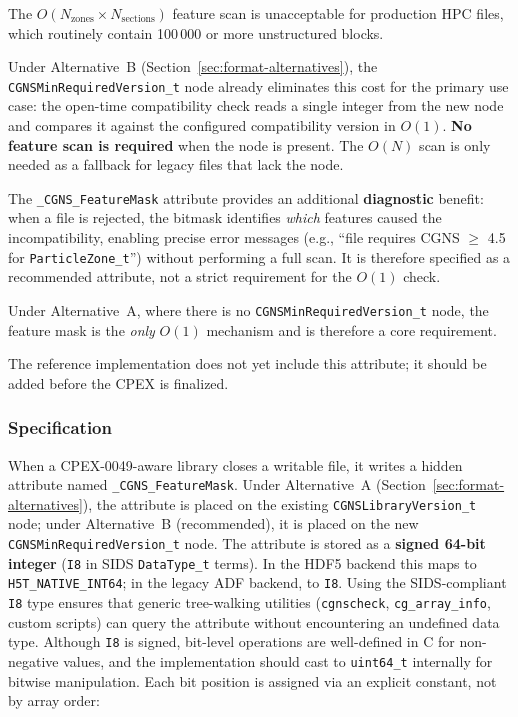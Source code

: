 \documentclass[11pt,letterpaper]{article}
\begin{document}
The $O(N_{\mathrm{zones}} \times N_{\mathrm{sections}})$ feature scan
is unacceptable for production HPC files, which routinely contain
100\,000 or more unstructured blocks.

Under Alternative~B (Section~\ref{sec:format-alternatives}), the
\texttt{CGNSMinRequiredVersion\_t} node already eliminates this cost
for the primary use case: the open-time compatibility check reads a
single integer from the new node and compares it against the
configured compatibility version in $O(1)$.  \textbf{No feature scan is required}
when the node is present.  The $O(N)$ scan is only needed as a
fallback for legacy files that lack the node.

The \texttt{\_CGNS\_FeatureMask} attribute provides an additional
\textbf{diagnostic} benefit: when a file is rejected, the bitmask
identifies \emph{which} features caused the incompatibility, enabling
precise error messages (e.g., ``file requires CGNS $\geq$ 4.5 for
\texttt{ParticleZone\_t}'') without performing a full scan.  It is
therefore specified as a recommended attribute, not a strict
requirement for the $O(1)$ check.

Under Alternative~A, where there is no
\texttt{CGNSMinRequiredVersion\_t} node, the feature mask is the
\emph{only} $O(1)$ mechanism and is therefore a core requirement.

The reference implementation does not yet include this attribute; it
should be added before the CPEX is finalized.

\subsubsection{Specification}

When a CPEX-0049-aware library closes a writable file, it writes a
hidden attribute named \texttt{\_CGNS\_FeatureMask}.  Under
Alternative~A (Section~\ref{sec:format-alternatives}), the attribute
is placed on the existing \texttt{CGNSLibraryVersion\_t} node; under
Alternative~B (recommended), it is placed on the new
\texttt{CGNSMinRequiredVersion\_t} node.  The attribute is stored as a
\textbf{signed 64-bit integer} (\texttt{I8} in SIDS
\texttt{DataType\_t} terms).  In the HDF5 backend this maps to
\texttt{H5T\_NATIVE\_INT64}; in the legacy ADF backend, to
\texttt{I8}.  Using the SIDS-compliant \texttt{I8} type ensures that
generic tree-walking utilities (\texttt{cgnscheck},
\texttt{cg\_array\_info}, custom scripts) can query the attribute
without encountering an undefined data type.  Although \texttt{I8} is
signed, bit-level operations are well-defined in C for non-negative
values, and the implementation should cast to \texttt{uint64\_t}
internally for bitwise manipulation.  Each bit position is assigned
via an explicit constant, not by array order:
\end{document}
